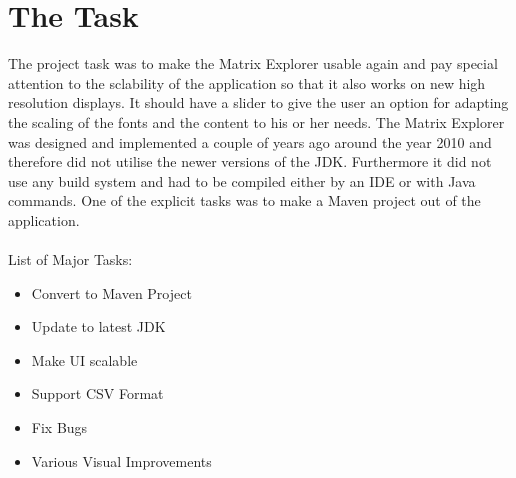 \section{The Task}

The project task was to make the Matrix Explorer usable again and pay special attention to the sclability of the application so that it also works on new high resolution displays. It should have a slider to give the user an option for adapting the scaling of the fonts and the content to his or her needs. The Matrix Explorer was designed and implemented a couple of years ago around the year 2010 and therefore did not utilise the newer versions of the JDK. Furthermore it did not use  any build system and had to be compiled either by an IDE or with Java commands. One of the explicit tasks was to make a Maven project out of the application.\\\\

List of Major Tasks:
\begin{itemize}
	\item Convert to Maven Project
	\item Update to latest JDK
	\item Make UI scalable
	\item Support CSV Format
	\item Fix Bugs
	\item Various Visual Improvements
\end{itemize}
